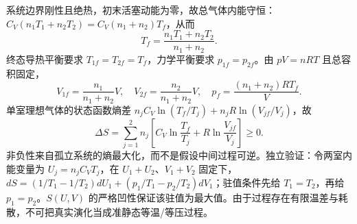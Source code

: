 系统边界刚性且绝热，初末活塞动能为零，故总气体内能守恒：\(C_V(n_1T_1+n_2T_2)=C_V(n_1+n_2)T_f\)，从而
\[T_f=\frac{n_1T_1+n_2T_2}{n_1+n_2}.\]
终态导热平衡要求 \(T_{1f}=T_{2f}=T_f\)，力学平衡要求 \(p_{1f}=p_{2f}\)。由 \(pV=nRT\) 且总容积固定，
\[V_{1f}=\frac{n_1}{n_1+n_2}V,\quad V_{2f}=\frac{n_2}{n_1+n_2}V,\quad p_f=\frac{(n_1+n_2)RT_f}{V}.\]
单室理想气体的状态函数熵差 \(n_jC_V\ln(T_f/T_j)+n_jR\ln(V_{jf}/V_j)\)，故
\[\Delta S=\sum_{j=1}^{2}n_j\left[C_V\ln\frac{T_f}{T_j}+R\ln\frac{V_{jf}}{V_j}\right]\ge0.\]
非负性来自孤立系统的熵最大化，而不是假设中间过程可逆。独立验证：令两室内能变量为 \(U_j=n_jC_VT_j\)，在 \(U_1+U_2\)、\(V_1+V_2\) 固定下，\(dS=(1/T_1-1/T_2)dU_1+(p_1/T_1-p_2/T_2)dV_1\)；驻值条件先给 \(T_1=T_2\)，再给 \(p_1=p_2\)。\(S(U,V)\) 的严格凹性保证该驻值为最大值。由于过程存在有限温差与耗散，不可把真实演化当成准静态等温/等压过程。
